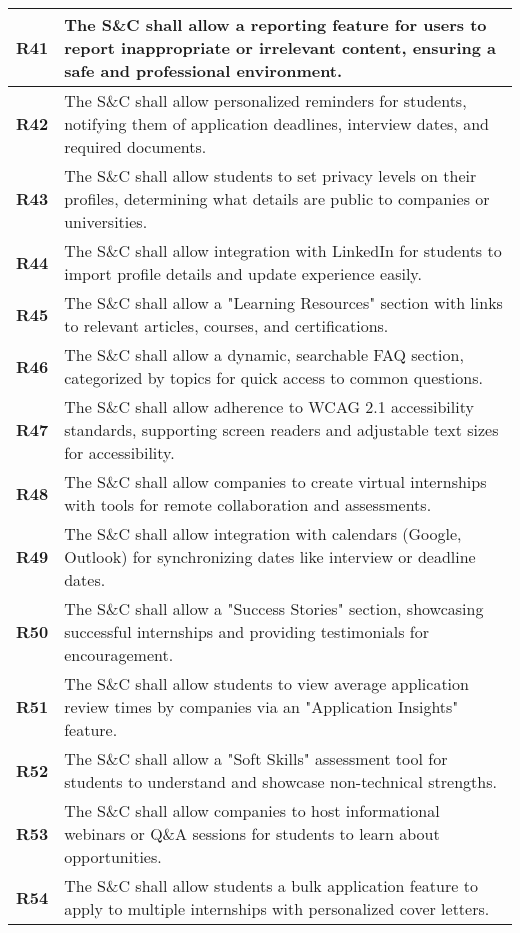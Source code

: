 \begin{longtable}{|p{}|p{}|}
\hline
\textbf{R41} & The S\&C shall allow a reporting feature for users to report inappropriate or irrelevant content, ensuring a safe and professional environment. \\ 
\hline
\textbf{R42} & The S\&C shall allow personalized reminders for students, notifying them of application deadlines, interview dates, and required documents. \\ 
\hline
\textbf{R43} & The S\&C shall allow students to set privacy levels on their profiles, determining what details are public to companies or universities. \\ 
\hline
\textbf{R44} & The S\&C shall allow integration with LinkedIn for students to import profile details and update experience easily. \\ 
\hline
\textbf{R45} & The S\&C shall allow a "Learning Resources" section with links to relevant articles, courses, and certifications. \\ 
\hline
\textbf{R46} & The S\&C shall allow a dynamic, searchable FAQ section, categorized by topics for quick access to common questions. \\ 
\hline
\textbf{R47} & The S\&C shall allow adherence to WCAG 2.1 accessibility standards, supporting screen readers and adjustable text sizes for accessibility. \\ 
\hline
\textbf{R48} & The S\&C shall allow companies to create virtual internships with tools for remote collaboration and assessments. \\ 
\hline
\textbf{R49} & The S\&C shall allow integration with calendars (Google, Outlook) for synchronizing dates like interview or deadline dates. \\ 
\hline
\textbf{R50} & The S\&C shall allow a "Success Stories" section, showcasing successful internships and providing testimonials for encouragement. \\ 
\hline
\textbf{R51} & The S\&C shall allow students to view average application review times by companies via an "Application Insights" feature. \\ 
\hline
\textbf{R52} & The S\&C shall allow a "Soft Skills" assessment tool for students to understand and showcase non-technical strengths. \\ 
\hline
\textbf{R53} & The S\&C shall allow companies to host informational webinars or Q\&A sessions for students to learn about opportunities. \\ 
\hline
\textbf{R54} & The S\&C shall allow students a bulk application feature to apply to multiple internships with personalized cover letters. \\ 

\end{longtable}

